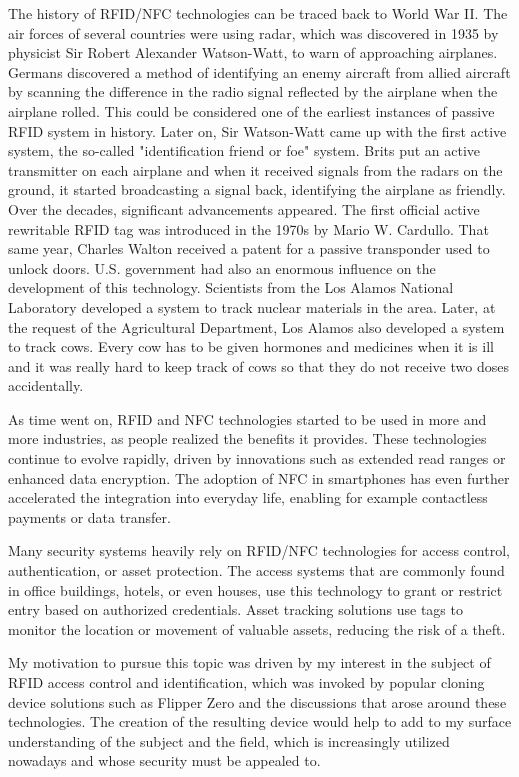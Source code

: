The history of RFID/NFC technologies can be traced back to World War II. The air forces of several countries were using radar, which was discovered in 1935 by physicist Sir Robert Alexander Watson-Watt, to warn of approaching airplanes. Germans discovered a method of identifying an enemy aircraft from allied aircraft by scanning the difference in the radio signal reflected by the airplane when the airplane rolled. This could be considered one of the earliest instances of passive RFID system in history. Later on, Sir Watson-Watt came up with the first active system, the so-called "identification friend or foe" system. Brits put an active transmitter on each airplane and when it received signals from the radars on the ground, it started broadcasting a signal back, identifying the airplane as friendly. Over the decades, significant advancements appeared. The first official active rewritable RFID tag was introduced in the 1970s by Mario W. Cardullo. That same year, Charles Walton received a patent for a passive transponder used to unlock doors. U.S. government had also an enormous influence on the development of this technology. Scientists from the Los Alamos National Laboratory developed a system to track nuclear materials in the area. Later, at the request of the Agricultural Department, Los Alamos also developed a system to track cows. Every cow has to be given hormones and medicines when it is ill and it was really hard to keep track of cows so that they do not receive two doses accidentally.~\cite{violino2005history}

As time went on, RFID and NFC technologies started to be used in more and more industries, as people realized the benefits it provides. These technologies continue to evolve rapidly, driven by innovations such as extended read ranges or enhanced data encryption. The adoption of NFC in smartphones has even further accelerated the integration into everyday life, enabling for example contactless payments or data transfer.

Many security systems heavily rely on RFID/NFC technologies for access control, authentication, or asset protection. The access systems that are commonly found in office buildings, hotels, or even houses, use this technology to grant or restrict entry based on authorized credentials. Asset tracking solutions use tags to monitor the location or movement of valuable assets, reducing the risk of a theft.

My motivation to pursue this topic was driven by my interest in the subject of RFID access control and identification, which was invoked by popular cloning device solutions such as Flipper Zero and the discussions that arose around these technologies. The creation of the resulting device would help to add to my surface understanding of the subject and the field, which is increasingly utilized nowadays and whose security must be appealed to.

